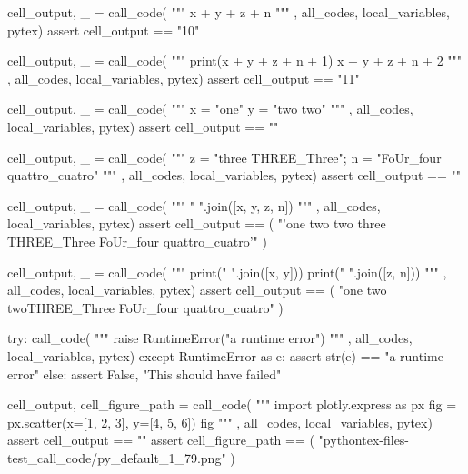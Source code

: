 \documentclass[oneside]{book}
\begin{document}
\begin{pycell}
cell_output, _ = call_code(
"""
x + y + z + n
"""
,
all_codes, local_variables, pytex)
assert cell_output == "10"
\end{pycell}

\begin{pycell}
cell_output, _ = call_code(
"""
print(x + y + z + n + 1)
x + y + z + n + 2
"""
,
all_codes, local_variables, pytex)
assert cell_output == "11"
\end{pycell}

\begin{pycell}
cell_output, _ = call_code(
"""
x = "one"
y = "two two"
"""
,
all_codes, local_variables, pytex)
assert cell_output == ""
\end{pycell}

\begin{pycell}
cell_output, _ = call_code(
"""
z = "three THREE_Three"; n = "FoUr_four quattro_cuatro"
"""
,
all_codes, local_variables, pytex)
assert cell_output == ""
\end{pycell}

\begin{pycell}
cell_output, _ = call_code(
"""
" ".join([x, y, z, n])
"""
,
all_codes, local_variables, pytex)
assert cell_output == (
    "'one two two three THREE_Three FoUr_four quattro_cuatro'"
)
\end{pycell}

\begin{pycell}
cell_output, _ = call_code(
"""
print(" ".join([x, y]))
print(" ".join([z, n]))
"""
,
all_codes, local_variables, pytex)
assert cell_output == (
    "one two two\nthree THREE_Three FoUr_four quattro_cuatro"
)
\end{pycell}

\begin{pycell}
try:
    call_code(
"""
raise RuntimeError("a runtime error")
"""
,
all_codes, local_variables, pytex)
except RuntimeError as e:
    assert str(e) == "a runtime error"
else:
    assert False, "This should have failed"
\end{pycell}

\begin{pycell}
cell_output, cell_figure_path = call_code(
"""
import plotly.express as px
fig = px.scatter(x=[1, 2, 3], y=[4, 5, 6])
fig
"""
,
all_codes, local_variables, pytex)
assert cell_output == ""
assert cell_figure_path == (
    "pythontex-files-test_call_code/py_default_1_79.png"
)
\end{pycell}
\end{document}

